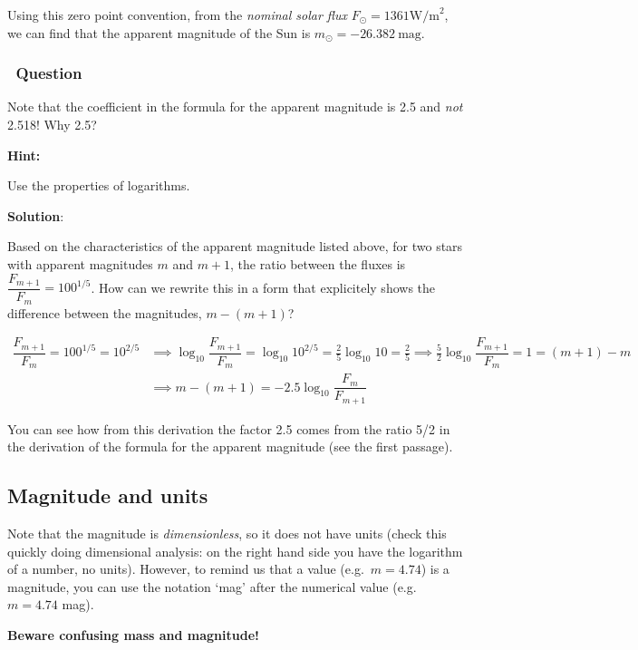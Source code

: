 \documentclass[
  letterpaper,
  DIV=11,
  numbers=noendperiod]{scrreprt}
\begin{document}
Using this zero point convention, from the \emph{nominal solar flux}
\(F_\odot = 1361 \mathrm{W/m}^2\), we can find that the apparent
magnitude of the Sun is \(m_\odot=-26.382\ \mathrm{mag}\).

\hypertarget{question-1}{%
\subsubsection{~Question}\label{question-1}}

Note that the coefficient in the formula for the apparent magnitude is
2.5 and \emph{not} 2.518! Why 2.5?

\textbf{Hint:}

Use the properties of logarithms.

\textbf{Solution}:

Based on the characteristics of the apparent magnitude listed above, for
two stars with apparent magnitudes \(m\) and \(m+1\), the ratio between
the fluxes is \(\dfrac{F_{m+1}}{F_m}=100^{1/5}\). How can we rewrite
this in a form that explicitely shows the difference between the
magnitudes, \(m-(m+1)\)?

\begin{align}
\dfrac{F_{m+1}}{F_m}=100^{1/5}=10^{2/5} &\implies \log_{10}{\dfrac{F_{m+1}}{F_m}}=\log_{10}{10^{2/5}}=\frac{2}{5}\log_{10}{10}=\frac{2}{5} \implies \frac{5}{2}\log_{10}{\dfrac{F_{m+1}}{F_m}} = 1 = (m+1) - m \\
&\implies m-(m+1)=-2.5\log_{10}{\dfrac{F_m}{F_{m+1}}}
\end{align}

You can see how from this derivation the factor 2.5 comes from the ratio
5/2 in the derivation of the formula for the apparent magnitude (see the
first passage).

\hypertarget{magnitude-and-units}{%
\subsection{Magnitude and units}\label{magnitude-and-units}}

Note that the magnitude is \emph{dimensionless}, so it does not have
units (check this quickly doing dimensional analysis: on the right hand
side you have the logarithm of a number, no units). However, to remind
us that a value (e.g.~\(m=4.74\)) is a magnitude, you can use the
notation `mag' after the numerical value (e.g.~\(m=4.74\) mag).

\textbf{Beware confusing mass and magnitude!}
\end{document}
